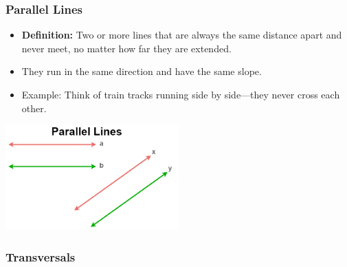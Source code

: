 \documentclass{beamer}
\begin{document}
\begin{frame}
    \frametitle{Parallel Lines}
    
    \begin{itemize}
        \item \textbf{Definition:} Two or more lines that are always the same distance apart and never meet, no matter how far they are extended.
        \item They run in the same direction and have the same slope.
        \item Example: Think of train tracks running side by side—they never cross each other.
    \end{itemize}
    
    \begin{center}
        \includegraphics[width=0.5\textwidth]{Parallellines.png} %
    \end{center}

\end{frame}


\begin{frame}
    \frametitle{Transversals}
\end{frame}


    


\end{document}
